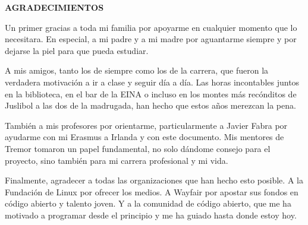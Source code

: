 
\begin{center}
{\LARGE \bfseries AGRADECIMIENTOS}
\vspace{2.5cm}
\end{center}

Un primer gracias a toda mi familia por apoyarme en cualquier momento que lo
necesitara. En especial, a mi padre y a mi madre por aguantarme siempre y por
dejarse la piel para que pueda estudiar.

A mis amigos, tanto los de siempre como los de la carrera, que fueron la
verdadera motivación a ir a clase y seguir día a día. Las horas incontables
juntos en la biblioteca, en el bar de la EINA o incluso en los montes más
recónditos de Juslibol a las dos de la madrugada, han hecho que estos años
merezcan la pena.

También a mis profesores por orientarme, particularmente a Javier Fabra por
ayudarme con mi Erasmus a Irlanda y con este documento. Mis mentores de Tremor
tomaron un papel fundamental, no solo dándome consejo para el proyecto, sino
también para mi carrera profesional y mi vida.

Finalmente, agradecer a todas las organizaciones que han hecho esto posible. A
la Fundación de Linux por ofrecer los medios. A Wayfair por apostar sus fondos
en código abierto y talento joven. Y a la comunidad de código abierto, que me ha
motivado a programar desde el principio y me ha guiado hasta donde estoy hoy.
